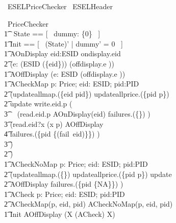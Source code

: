 \begin{zsection}
	\SECTION\ ESELPriceChecker \parents\ ESELHeader
\end{zsection}

\begin{circus}
	\circprocess\ PriceChecker \circdef \circbegin \\
        \t1 \circstate\ State == [~ dummy: \{0\} ~] \\
    	\t1	Init == [~ (State)' | dummy' = 0 ~] \\
        \t1 AOnDisplay \circdef eid:ESID \circspot ondisplay.eid \then \\
            \t2 (\Interleave e: (ESID \setminus (\{eid\})) \linter \emptyset \rinter \circspot (offdisplay.e \then \Skip)) \\
        \t1 AOffDisplay \circdef (\Interleave e: ESID \linter \emptyset \rinter \circspot (offdisplay.e \then \Skip)) \\
        \t1 ACheckMap \circdef p: Price; eid: ESID; pid:PID \circspot \\
            \t2 (updateallmap.(\{eid \mapsto pid\}) \then updateallprice.(\{pid \mapsto p\}) \then \\
            \t2 update \then write.eid.p \then ( \\
                \t3 \,\,\,\,\,\,(read.eid.p \then AOnDisplay(eid) \circseq failures.(\{\}) \then \Skip) \\
                \t3 \extchoice (read.eid?x \prefixcolon (x \neq p) \then AOffDisplay \circseq \\
                \t4 failures.(\{pid \mapsto \{(fail~eid)\}\}) \then \Skip) \\
                \t3 ) \\
            \t2 ) \\
        \t1 ACheckNoMap \circdef p: Price; eid: ESID; pid:PID \circspot \\
            \t2 (updateallmap.(\{\}) \then updateallprice.(\{pid \mapsto p\}) \then update \then \\
            \t2 AOffDisplay \circseq failures.(\{pid \mapsto \{NA\}\}) \then \Skip) \\
        \t1 ACheck \circdef \circvar p: Price; eid: ESID; pid:PID \circspot \\
            \t2 ACheckMap(p, eid, pid) \extchoice ACheckNoMap(p, eid, pid) \\
	    \t1 \circspot \lschexpract Init \rschexpract \circseq AOffDisplay \circseq (\circmu X \circspot (ACheck) \circseq X) \\
	\circend
\end{circus}

